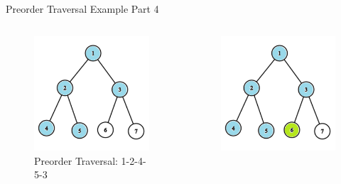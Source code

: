 \documentclass[aspectratio=169]{beamer}%
\begin{document}
\begin{frame}{Preorder Traversal Example Part 4}
    \begin{columns}
        \begin{column}{0.32\textwidth}
            \begin{figure}
                \centering
                \includegraphics[width = .9\linewidth]{tree-pre 10.png}
                \caption{Preorder Traversal: 1-2-4-5-3}
            \end{figure}
        \end{column}
        \hfill
        \begin{column}{0.32\textwidth}
            \begin{figure}
                \centering
                \includegraphics[width = .9\linewidth]{tree-pre 11.png}

\end{figure}
\end{column}
\end{columns}
\end{frame}
\end{document}
